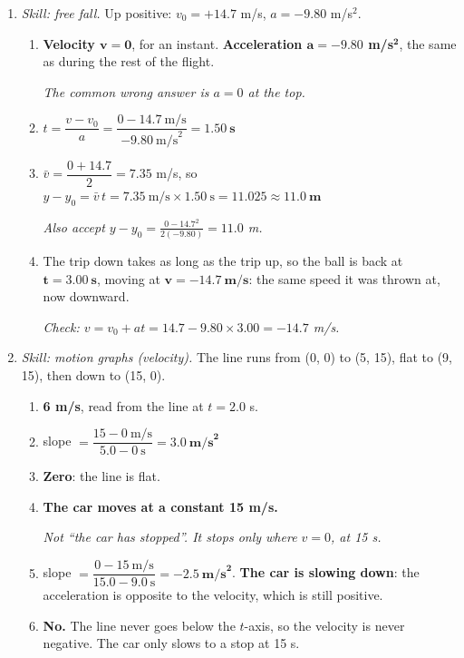 \documentclass[12pt, twoside]{article}
\begin{document}
\begin{enumerate}[itemsep=0.5cm]
\item \emph{Skill: free fall.} Up positive: $v_0 = +14.7$ m/s, $a = -9.80$ m/s$^2$.
  \begin{enumerate}[itemsep=0.3cm]
    \item \textbf{Velocity $\mathbf{v = 0}$}, for an instant. \textbf{Acceleration
      $\mathbf{a = -9.80}$ m/s$^\mathbf{2}$}, the same as during the rest of the
      flight.

      \emph{The common wrong answer is $a = 0$ at the top.}
    \item $t = \dfrac{v - v_0}{a} = \dfrac{0 - 14.7~\text{m/s}}{-9.80~\text{m/s}^2}
      = \mathbf{1.50~\textbf{s}}$
    \item $\bar{v} = \dfrac{0 + 14.7}{2} = 7.35$ m/s, so
      $y - y_0 = \bar{v}\,t = 7.35~\text{m/s} \times 1.50~\text{s} = 11.025
      \approx \mathbf{11.0~\textbf{m}}$

      \emph{Also accept $y - y_0 = \frac{0 - 14.7^2}{2(-9.80)} = 11.0$ m.}
    \item The trip down takes as long as the trip up, so the ball is back at
      $\mathbf{t = 3.00~\textbf{s}}$, moving at $\mathbf{v = -14.7~\textbf{m/s}}$:
      the same speed it was thrown at, now downward.

      \emph{Check: $v = v_0 + at = 14.7 - 9.80 \times 3.00 = -14.7$ m/s.}
  \end{enumerate}

\item \emph{Skill: motion graphs (velocity).} The line runs from (0, 0) to (5, 15),
  flat to (9, 15), then down to (15, 0).
  \begin{enumerate}[itemsep=0.3cm]
    \item \textbf{6 m/s}, read from the line at $t = 2.0$ s.
    \item slope $= \dfrac{15 - 0~\text{m/s}}{5.0 - 0~\text{s}} =
      \mathbf{3.0~\textbf{m/s}^\mathbf{2}}$
    \item \textbf{Zero}: the line is flat.
    \item \textbf{The car moves at a constant 15 m/s.}

      \emph{Not ``the car has stopped''. It stops only where $v = 0$, at 15 s.}
    \item slope $= \dfrac{0 - 15~\text{m/s}}{15.0 - 9.0~\text{s}} =
      \mathbf{-2.5~\textbf{m/s}^\mathbf{2}}$. \textbf{The car is slowing down}: the
      acceleration is opposite to the velocity, which is still positive.
    \item \textbf{No.} The line never goes below the $t$-axis, so the velocity is
      never negative. The car only slows to a stop at 15 s.
  \end{enumerate}


\end{enumerate}
\end{document}
